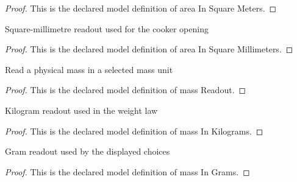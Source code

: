 \begin{proof}
  This is the declared model definition of area In Square Meters.
\end{proof}
\begin{definition}
  \label{def:physics:phyx-mini-0440:phyxminiproblems-problemphyxmini0440-areainsquaremillimeters}
  Square-millimetre readout used for the cooker opening
\end{definition}
\begin{proof}
  This is the declared model definition of area In Square Millimeters.
\end{proof}
\begin{definition}
  \label{def:physics:phyx-mini-0440:phyxminiproblems-problemphyxmini0440-massreadout}
  Read a physical mass in a selected mass unit
\end{definition}
\begin{proof}
  This is the declared model definition of mass Readout.
\end{proof}
\begin{definition}
  \label{def:physics:phyx-mini-0440:phyxminiproblems-problemphyxmini0440-massinkilograms}
  Kilogram readout used in the weight law
\end{definition}
\begin{proof}
  This is the declared model definition of mass In Kilograms.
\end{proof}
\begin{definition}
  \label{def:physics:phyx-mini-0440:phyxminiproblems-problemphyxmini0440-massingrams}
  Gram readout used by the displayed choices
\end{definition}
\begin{proof}
  This is the declared model definition of mass In Grams.
\end{proof}
